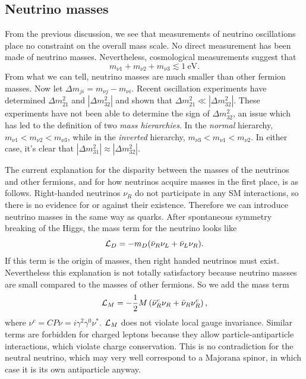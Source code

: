 \subsection{Neutrino masses}
From the previous discussion, we see that measurements of neutrino oscillations
place no constraint on the overall mass scale. No direct measurement has been
made of neutrino masses. Nevertheless, cosmological measurements suggest
that \cite{thomson_modern_2013}
\begin{equation}
  m_{\nu1}+m_{\nu2}+m_{\nu3}\lesssim1~\text{eV}. 
\end{equation}
From what we can tell,
neutrino masses are much smaller than other fermion masses. Now let
$\Delta m_{ji}=m_{\nu j}-m_{\nu i}$.
Recent oscillation experiments have determined $\Delta m_{21}^2$ and
$|\Delta m_{32}^2|$ and shown that $\Delta m_{21}^2\ll|\Delta m_{32}^2|$.
These experiments have not been able to determine the sign of
$\Delta m_{32}^2$, an issue which has led to the definition of two {\it mass
hierarchies}. 
In the {\it normal} hierarchy, $m_{\nu1}<m_{\nu2}<m_{\nu3}$,
while in the {\it inverted} hierarchy, $m_{\nu3}<m_{\nu1}<m_{\nu2}$. In
either case, it's clear that $|\Delta m_{31}^2|\approx|\Delta m_{32}^2|$.

The current explanation for the disparity between the masses of the neutrinos
and other fermions, and for how neutrinos acquire masses in the
first place, is as follows. Right-handed neutrinos $\nu_R$ do not
participate in any SM interactions, so
there is no evidence for or against their existence. Therefore we can introduce
neutrino masses in the same way as quarks. After spontaneous symmetry breaking
of the Higgs, the mass term for the neutrino looks like
\begin{equation}
  \mathcal{L}_D=-m_D(\bar{\nu}_R\nu_L+\bar{\nu}_L\nu_R).
\end{equation}
If this term is the origin of masses, then right handed neutrinos must exist.
Nevertheless this explanation is not totally satisfactory because neutrino
masses are small compared to the masses of other fermions. So we add
the mass term
\begin{equation}
  \mathcal{L}_M=-\frac{1}{2}M\left(\bar{\nu}^c_R\nu_R+\bar{\nu}_R\nu^c_R\right),
\end{equation}
where $\nu^c=CP\nu=i\gamma^2\gamma^0\nu^*$. $\mathcal{L}_M$ does not violate local
gauge invariance. Similar terms are forbidden for charged leptons because
they allow particle-antiparticle interactions, which violate charge
conservation. This is no contradiction for the neutral neutrino, which may
very well correspond to a Majorana spinor, in which case it is its own
antiparticle anyway.

